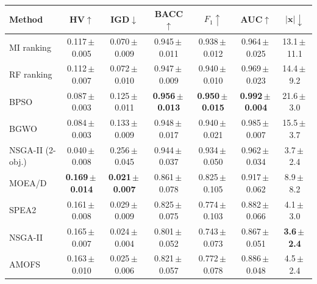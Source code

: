 \begin{tabular}{lcccccc}
\toprule
Method & HV$\uparrow$ & IGD$\downarrow$ & BACC$\uparrow$ & $F_1\uparrow$ & AUC$\uparrow$ & $|\mathbf{x}|\downarrow$ \\
\midrule
MI ranking & 0.117\,$\pm$\,0.005 & 0.070\,$\pm$\,0.009 & 0.945\,$\pm$\,0.011 & 0.938\,$\pm$\,0.012 & 0.964\,$\pm$\,0.025 & 13.1\,$\pm$\,11.1 \\
RF ranking & 0.112\,$\pm$\,0.007 & 0.072\,$\pm$\,0.010 & 0.947\,$\pm$\,0.009 & 0.940\,$\pm$\,0.010 & 0.969\,$\pm$\,0.023 & 14.4\,$\pm$\,9.2 \\
BPSO & 0.087\,$\pm$\,0.003 & 0.125\,$\pm$\,0.011 & \textbf{0.956\,$\pm$\,0.013} & \textbf{0.950\,$\pm$\,0.015} & \textbf{0.992\,$\pm$\,0.004} & 21.6\,$\pm$\,3.0 \\
BGWO & 0.084\,$\pm$\,0.003 & 0.133\,$\pm$\,0.009 & 0.948\,$\pm$\,0.017 & 0.940\,$\pm$\,0.021 & 0.985\,$\pm$\,0.007 & 15.5\,$\pm$\,3.7 \\
NSGA-II (2-obj.) & 0.040\,$\pm$\,0.008 & 0.256\,$\pm$\,0.045 & 0.944\,$\pm$\,0.037 & 0.934\,$\pm$\,0.050 & 0.962\,$\pm$\,0.034 & 3.7\,$\pm$\,2.4 \\
MOEA/D & \textbf{0.169\,$\pm$\,0.014} & \textbf{0.021\,$\pm$\,0.007} & 0.861\,$\pm$\,0.078 & 0.825\,$\pm$\,0.105 & 0.917\,$\pm$\,0.062 & 8.9\,$\pm$\,8.2 \\
SPEA2 & 0.161\,$\pm$\,0.008 & 0.029\,$\pm$\,0.009 & 0.825\,$\pm$\,0.075 & 0.774\,$\pm$\,0.103 & 0.882\,$\pm$\,0.066 & 4.1\,$\pm$\,3.0 \\
NSGA-II & 0.165\,$\pm$\,0.007 & 0.024\,$\pm$\,0.004 & 0.801\,$\pm$\,0.052 & 0.743\,$\pm$\,0.073 & 0.867\,$\pm$\,0.051 & \textbf{3.6\,$\pm$\,2.4} \\
AMOFS & 0.163\,$\pm$\,0.010 & 0.025\,$\pm$\,0.006 & 0.821\,$\pm$\,0.057 & 0.772\,$\pm$\,0.078 & 0.886\,$\pm$\,0.048 & 4.5\,$\pm$\,2.4 \\
\bottomrule
\end{tabular}
